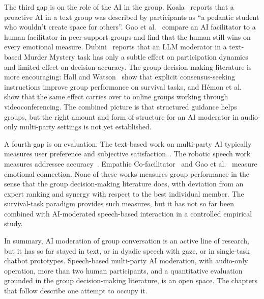 The third gap is on the role of the AI in the group. Koala~\cite{houde2025koala} reports that a proactive AI in a text group was described by participants as ``a pedantic student who wouldn't create space for others''. Gao et al.~\cite{gao2025facilitation} compare an AI facilitator to a human facilitator in peer-support groups and find that the human still wins on every emotional measure. Dubini~\cite{dubini2024multiuser} reports that an LLM moderator in a text-based Murder Mystery task has only a subtle effect on participation dynamics and limited effect on decision accuracy. The group decision-making literature is more encouraging: Hall and Watson~\cite{hall1970normative} show that explicit consensus-seeking instructions improve group performance on survival tasks, and Hémon et al.~\cite{hemon2024constructive} show that the same effect carries over to online groups working through videoconferencing. The combined picture is that structured guidance helps groups, but the right amount and form of structure for an AI moderator in audio-only multi-party settings is not yet established.

A fourth gap is on evaluation. The text-based work on multi-party AI typically measures user preference and subjective satisfaction~\cite{houde2025koala,zheng2022polyadic}. The robotic speech work measures addressee accuracy~\cite{addlesee2024ari,axelsson2025furhat}. Empathic Co-facilitator~\cite{adikari2022empathic} and Gao et al.~\cite{gao2025facilitation} measure emotional connection. None of these works measures group performance in the sense that the group decision-making literature does, with deviation from an expert ranking and synergy with respect to the best individual member. The survival-task paradigm provides such measures, but it has not so far been combined with AI-moderated speech-based interaction in a controlled empirical study.

In summary, AI moderation of group conversation is an active line of research, but it has so far stayed in text, or in dyadic speech with gaze, or in single-task chatbot prototypes. Speech-based multi-party AI moderation, with audio-only operation, more than two human participants, and a quantitative evaluation grounded in the group decision-making literature, is an open space. The chapters that follow describe one attempt to occupy it.

